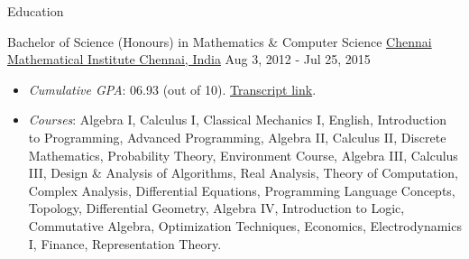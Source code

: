 \documentclass[]{mcdowellcv}
\begin{document}
\begin{cvsection}{Education}
\begin{cvsubsection}
      {Bachelor of Science (Honours) in Mathematics \& Computer Science}
      {\href{https://www.cmi.ac.in/}{Chennai Mathematical Institute \linebreak Chennai, India}}
      {Aug 3, 2012 - Jul 25, 2015}
      \begin{itemize}
        \item
          \textit{Cumulative GPA}: 06.93 (out of 10).
          \href{https://drive.google.com/file/d/1azLzpG9HNLKuCWK21QHGjXc02za2fGW3/view?usp=sharing}{Transcript
          link}.
        \item
          \textit{Courses}: Algebra I, Calculus I, Classical Mechanics I,
          English, Introduction to Programming, Advanced Programming, Algebra
          II, Calculus II, Discrete Mathematics, Probability Theory,
          Environment Course, Algebra III, Calculus III, Design \& Analysis of
          Algorithms, Real Analysis, Theory of Computation, Complex Analysis,
          Differential Equations, Programming Language Concepts, Topology,
          Differential Geometry, Algebra IV, Introduction to Logic, Commutative
          Algebra, Optimization Techniques, Economics, Electrodynamics I,
          Finance, Representation Theory.
      \end{itemize}
    \end{cvsubsection}
  \end{cvsection}
\end{document}
